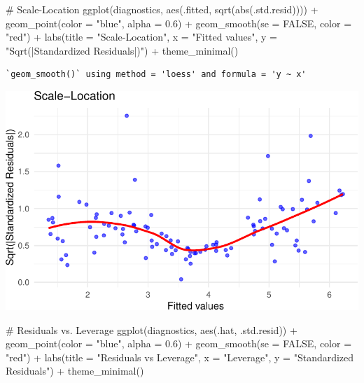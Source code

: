 \documentclass[
  11pt,
]{article}
\newenvironment{Shaded}{\begin{snugshade}}{\end{snugshade}}
\newcommand{\AttributeTok}[1]{\textcolor[rgb]{0.40,0.45,0.13}{#1}}
\newcommand{\CommentTok}[1]{\textcolor[rgb]{0.37,0.37,0.37}{#1}}
\newcommand{\ConstantTok}[1]{\textcolor[rgb]{0.56,0.35,0.01}{#1}}
\newcommand{\FloatTok}[1]{\textcolor[rgb]{0.68,0.00,0.00}{#1}}
\newcommand{\FunctionTok}[1]{\textcolor[rgb]{0.28,0.35,0.67}{#1}}
\newcommand{\NormalTok}[1]{\textcolor[rgb]{0.00,0.23,0.31}{#1}}
\newcommand{\SpecialCharTok}[1]{\textcolor[rgb]{0.37,0.37,0.37}{#1}}
\newcommand{\StringTok}[1]{\textcolor[rgb]{0.13,0.47,0.30}{#1}}
\begin{document}
\begin{Shaded}
\begin{Highlighting}[]
\CommentTok{\# Scale{-}Location }
\FunctionTok{ggplot}\NormalTok{(diagnostics, }\FunctionTok{aes}\NormalTok{(.fitted, }\FunctionTok{sqrt}\NormalTok{(}\FunctionTok{abs}\NormalTok{(.std.resid)))) }\SpecialCharTok{+}
  \FunctionTok{geom\_point}\NormalTok{(}\AttributeTok{color =} \StringTok{"blue"}\NormalTok{, }\AttributeTok{alpha =} \FloatTok{0.6}\NormalTok{) }\SpecialCharTok{+}
  \FunctionTok{geom\_smooth}\NormalTok{(}\AttributeTok{se =} \ConstantTok{FALSE}\NormalTok{, }\AttributeTok{color =} \StringTok{"red"}\NormalTok{) }\SpecialCharTok{+}
  \FunctionTok{labs}\NormalTok{(}\AttributeTok{title =} \StringTok{"Scale{-}Location"}\NormalTok{, }\AttributeTok{x =} \StringTok{"Fitted values"}\NormalTok{, }
       \AttributeTok{y =} \StringTok{"Sqrt(|Standardized Residuals|)"}\NormalTok{) }\SpecialCharTok{+}
  \FunctionTok{theme\_minimal}\NormalTok{()}
\end{Highlighting}
\end{Shaded}

\begin{verbatim}
`geom_smooth()` using method = 'loess' and formula = 'y ~ x'
\end{verbatim}

\includegraphics{HW-4-CODE-and-ANSWERS_files/figure-pdf/unnamed-chunk-3-1.pdf}

\begin{Shaded}
\begin{Highlighting}[]
\CommentTok{\# Residuals vs. Leverage}
\FunctionTok{ggplot}\NormalTok{(diagnostics, }\FunctionTok{aes}\NormalTok{(.hat, .std.resid)) }\SpecialCharTok{+}
  \FunctionTok{geom\_point}\NormalTok{(}\AttributeTok{color =} \StringTok{"blue"}\NormalTok{, }\AttributeTok{alpha =} \FloatTok{0.6}\NormalTok{) }\SpecialCharTok{+}
  \FunctionTok{geom\_smooth}\NormalTok{(}\AttributeTok{se =} \ConstantTok{FALSE}\NormalTok{, }\AttributeTok{color =} \StringTok{"red"}\NormalTok{) }\SpecialCharTok{+}
  \FunctionTok{labs}\NormalTok{(}\AttributeTok{title =} \StringTok{"Residuals vs Leverage"}\NormalTok{, }\AttributeTok{x =} \StringTok{"Leverage"}\NormalTok{, }
       \AttributeTok{y =} \StringTok{"Standardized Residuals"}\NormalTok{) }\SpecialCharTok{+}
  \FunctionTok{theme\_minimal}\NormalTok{()}
\end{Highlighting}
\end{Shaded}
\end{document}
